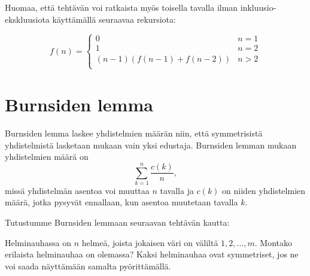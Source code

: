 Huomaa, että tehtävän voi ratkaista myös toisella
tavalla ilman inkluusio-ekskluusiota
käyttämällä seuraavaa rekursiota:

\begin{equation*}
    f(n) = \begin{cases}
               0               & n = 1\\
               1               & n = 2\\
               (n-1)(f(n-1) + f(n-2)) & n>2 \\
           \end{cases}
\end{equation*}

\section{Burnsiden lemma}

Burnsiden lemma laskee yhdistelmien määrän niin,
että symmetrisistä yhdistelmistä lasketaan
mukaan vain yksi edustaja.
Burnsiden lemman mukaan yhdistelmien määrä on
\[\sum_{k=1}^n \frac{c(k)}{n},\]
missä yhdistelmän asentoa voi muuttaa $n$ tavalla
ja $c(k)$ on niiden yhdistelmien määrä,
jotka pysyvät ennallaan, kun asentoa
muutetaan tavalla $k$.

Tutustumme Burnsiden lemmaan seuraavan tehtävän kautta:

\begin{task}
Helminauhassa on $n$ helmeä,
joista jokaisen väri on väliltä $1,2,\ldots,m$.
Montako erilaista helminauhaa on olemassa?
Kaksi helminauhaa ovat symmetriset,
jos ne voi saada näyttämään samalta pyörittämällä.
\end{task}

